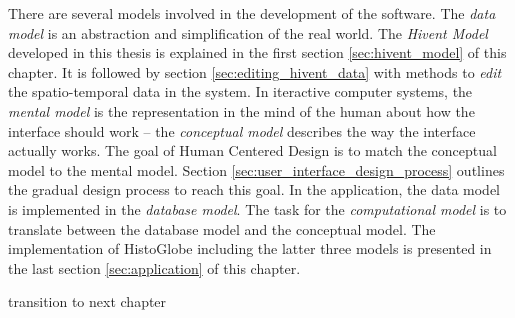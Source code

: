 There are several models involved in the development of the software. The \emph{data model} is an abstraction and simplification of the real world. The \emph{Hivent Model} developed in this thesis is explained in the first section \ref{sec:hivent_model} of this chapter. It is followed by section \ref{sec:editing_hivent_data} with methods to \emph{edit} the spatio-temporal data in the system. In iteractive computer systems, the \emph{mental model} is the representation in the mind of the human about how the interface should work -- the \emph{conceptual model} describes the way the interface actually works. The goal of Human Centered Design is to match the conceptual model to the mental model. Section \ref{sec:user_interface_design_process} outlines the gradual design process to reach this goal. In the application, the data model is implemented in the \emph{database model}. The task for the \emph{computational model} is to translate between the database model and the conceptual model. The implementation of HistoGlobe including the latter three models is presented in the last section \ref{sec:application} of this chapter.

\newpage







\vspace{2em}
transition to next chapter